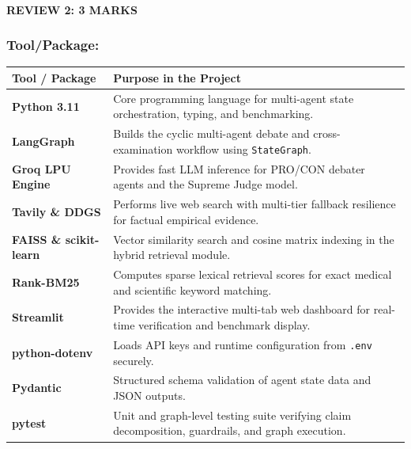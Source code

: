 \documentclass[aspectratio=169, 10pt]{beamer}
\begin{document}
\begin{frame}
    \framesubtitle{REVIEW 2: 3 MARKS}
    \frametitle{Tool/Package:}
    \vspace{-0.15cm}
    \setlength{\tabcolsep}{4pt}
    \renewcommand{\arraystretch}{1.10}
    \scriptsize
    \noindent
    \begin{tabularx}{\textwidth}{l >{\raggedright\arraybackslash}X}
        \toprule
        \rowcolor{HeaderBg}
        \textbf{Tool / Package} & \textbf{Purpose in the Project} \\
        \midrule
        \textbf{Python 3.11} & Core programming language for multi-agent state orchestration, typing, and benchmarking. \\
        \rowcolor{RowAlt}
        \textbf{LangGraph} & Builds the cyclic multi-agent debate and cross-examination workflow using \texttt{StateGraph}. \\
        \textbf{Groq LPU Engine} & Provides fast LLM inference for PRO/CON debater agents and the Supreme Judge model. \\
        \rowcolor{RowAlt}
        \textbf{Tavily \& DDGS} & Performs live web search with multi-tier fallback resilience for factual empirical evidence. \\
        \textbf{FAISS \& scikit-learn} & Vector similarity search and cosine matrix indexing in the hybrid retrieval module. \\
        \rowcolor{RowAlt}
        \textbf{Rank-BM25} & Computes sparse lexical retrieval scores for exact medical and scientific keyword matching. \\
        \textbf{Streamlit} & Provides the interactive multi-tab web dashboard for real-time verification and benchmark display. \\
        \rowcolor{RowAlt}
        \textbf{python-dotenv} & Loads API keys and runtime configuration from \texttt{.env} securely. \\
        \textbf{Pydantic} & Structured schema validation of agent state data and JSON outputs. \\
        \rowcolor{RowAlt}
        \textbf{pytest} & Unit and graph-level testing suite verifying claim decomposition, guardrails, and graph execution. \\
        \bottomrule
    \end{tabularx}
\end{frame}
\end{document}
